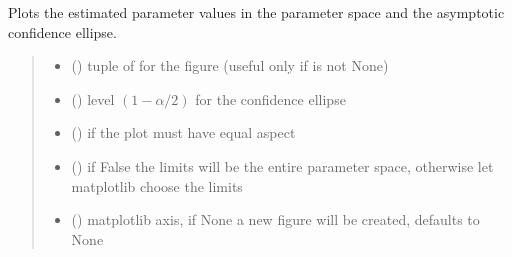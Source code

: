 \documentclass[letterpaper,10pt,english]{sphinxmanual}
\begin{document}
\begin{fulllineitems}
\begin{fulllineitems}
\label{\detokenize{cubmods:cubmods.cub.CUBresCUB00.plot_confell}}
\pysigstartsignatures
{}
\pysigstopsignatures
\sphinxAtStartPar
Plots the estimated parameter values in the parameter space and
the asymptotic confidence ellipse.
\begin{quote}\begin{description}
\begin{itemize}
\item {} 
\sphinxAtStartPar
{} () \textendash{} tuple of  for the figure (useful only if  is not None)

\item {} 
\sphinxAtStartPar
{} () \textendash{} level \((1-\alpha/2)\) for the confidence ellipse

\item {} 
\sphinxAtStartPar
{} () \textendash{} if the plot must have equal aspect

\item {} 
\sphinxAtStartPar
{} () \textendash{} if False the limits will be the entire parameter space, otherwise let matplotlib choose the limits

\item {} 
\sphinxAtStartPar
{} (\sphinxstyleliteralemphasis{\sphinxupquote{, }}) \textendash{} matplotlib axis, if None a new figure will be created, defaults to None


\end{itemize}
\end{description}
\end{quote}
\end{fulllineitems}
\end{fulllineitems}
\end{document}
